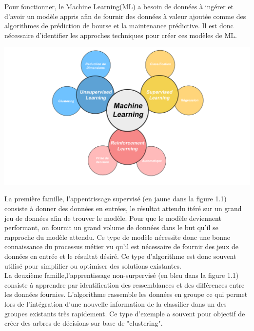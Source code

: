 \documentclass[12pt,a4paper]{report}
\begin{document}
Pour fonctionner, le Machine Learning(ML) a besoin de données à ingérer et d'avoir un modèle appris afin de fournir des données à valeur ajoutée comme des algorithmes de prédiction de bourse et la maintenance prédictive. Il est donc nécessaire d'identifier les approches techniques pour créer ces modèles de ML.\\

\begin{center}
	\includegraphics[scale=0.2]{ML_vignette}
	\label{fig1}
\end{center}

La première famille, l'appentrissage supervisé (en jaune dans la figure 1.1) consiste à donner des données en entrées, le résultat attendu itéré sur un grand jeu de données afin de trouver le modèle. Pour que le modèle deviennent performant, on fournit un grand volume de données dans le but qu'il se rapproche du modèle attendu. Ce type de modèle nécessite donc une bonne connaissance du processus métier vu qu'il est nécessaire de fournir des jeux de données en entrée et le résultat désiré. Ce type d'algorithme est donc souvent utilisé pour simplifier ou optimiser des solutions existantes.\\

La deuxième famille,l'apprentissage non-surpervisé (en bleu dans la figure 1.1) consiste à apprendre par identification des ressemblances et des différences entre les données fournies. L'algorithme rassemble les données en groupe ce qui permet lors de l'intégration d'une nouvelle information de la classifier dans un des groupes existants très rapidement. Ce type d'exemple a souvent pour objectif de créer des arbres de décisions sur base de "clustering".\\
\end{document}
